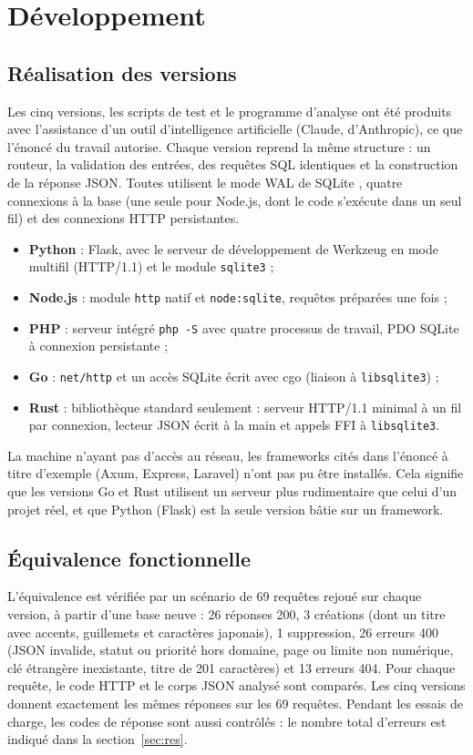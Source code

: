 \section{Développement}\label{sec:dev}
\subsection{Réalisation des versions}
Les cinq versions, les scripts de test et le programme d'analyse ont été produits avec l'assistance d'un outil
d'intelligence artificielle (Claude, d'Anthropic), ce que l'énoncé du travail autorise. Chaque version reprend la
même structure : un routeur, la validation des entrées, des requêtes SQL identiques et la construction de la réponse
JSON. Toutes utilisent le mode WAL de SQLite \cite{sqlitewal}, quatre connexions à la base (une seule pour Node.js, dont le code
s'exécute dans un seul fil) et des connexions HTTP persistantes.
\begin{itemize}[leftmargin=*,itemsep=0pt,topsep=2pt]
\item \textbf{Python} : Flask, avec le serveur de développement de Werkzeug en mode multifil (HTTP/1.1) et le module
\texttt{sqlite3} ;
\item \textbf{Node.js} : module \texttt{http} natif et \texttt{node:sqlite}, requêtes préparées une fois ;
\item \textbf{PHP} : serveur intégré \texttt{php -S} avec quatre processus de travail, PDO SQLite à connexion persistante ;
\item \textbf{Go} : \texttt{net/http} et un accès SQLite écrit avec cgo (liaison à \texttt{libsqlite3}) ;
\item \textbf{Rust} : bibliothèque standard seulement : serveur HTTP/1.1 minimal à un fil par connexion, lecteur
JSON écrit à la main et appels FFI à \texttt{libsqlite3}.
\end{itemize}
La machine n'ayant pas d'accès au réseau, les frameworks cités dans l'énoncé à titre d'exemple (Axum, Express,
Laravel) n'ont pas pu être installés. Cela signifie que les versions Go et Rust utilisent un serveur plus
rudimentaire que celui d'un projet réel, et que Python (Flask) est la seule version bâtie sur un framework.

\subsection{Équivalence fonctionnelle}
L'équivalence est vérifiée par un scénario de 69 requêtes rejoué sur chaque version, à partir d'une base neuve : 26
réponses 200, 3 créations (dont un titre avec accents, guillemets et caractères japonais), 1 suppression, 26 erreurs
400 (JSON invalide, statut ou priorité hors domaine, page ou limite non numérique, clé étrangère inexistante,
titre de 201 caractères) et 13 erreurs 404. Pour chaque requête, le code HTTP et le corps JSON analysé sont comparés.
Les cinq versions donnent exactement les mêmes réponses sur les 69 requêtes. Pendant les essais de charge, les
codes de réponse sont aussi contrôlés : le nombre total d'erreurs est indiqué dans la section~\ref{sec:res}.

